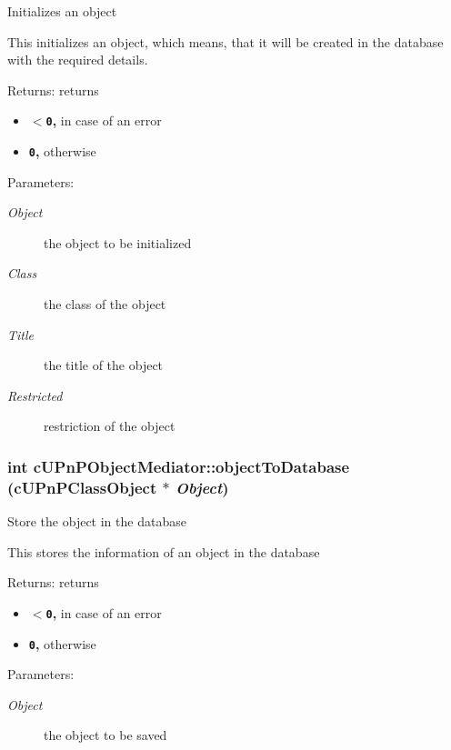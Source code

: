 Initializes an object

This initializes an object, which means, that it will be created in the database with the required details.

\begin{Desc}
\item[Returns:]returns\begin{itemize}
\item {\bf {\tt $<$0},} in case of an error\item {\bf {\tt 0},} otherwise \end{itemize}
\end{Desc}
\begin{Desc}
\item[Parameters:]
\begin{description}
\item[{\em Object}]the object to be initialized \item[{\em Class}]the class of the object \item[{\em Title}]the title of the object \item[{\em Restricted}]restriction of the object \end{description}
\end{Desc}
\hypertarget{classcUPnPObjectMediator_c44c010895f92adc63af2a2d34cf34c8}{
\subsubsection[{objectToDatabase}]{\setlength{\rightskip}{0pt plus 5cm}int cUPnPObjectMediator::objectToDatabase ({\bf cUPnPClassObject} $\ast$ {\em Object})}}
\label{classcUPnPObjectMediator_c44c010895f92adc63af2a2d34cf34c8}


Store the object in the database

This stores the information of an object in the database

\begin{Desc}
\item[Returns:]returns\begin{itemize}
\item {\bf {\tt $<$0},} in case of an error\item {\bf {\tt 0},} otherwise \end{itemize}
\end{Desc}
\begin{Desc}
\item[Parameters:]
\begin{description}
\item[{\em Object}]the object to be saved \end{description}
\end{Desc}


